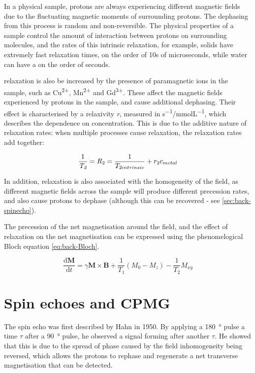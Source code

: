 In a physical sample, protons are always experiencing different magnetic fields due to the fluctuating magnetic moments of surrounding protons.
The dephasing from this process is random and non-reversible.
The physical properties of a sample control the amount of interaction between protons on surrounding molecules, and the rates of this intrinsic \Ttwo relaxation, for example, solids have extremely fast \Ttwo relaxation times, on the order of 10s of microseconds, while water can have a \Ttwo on the order of seconds.

\Ttwo relaxation is also be increased by the presence of paramagnetic ions in the sample, such as Cu\textsuperscript{2+}, Mn\textsuperscript{2+} and Gd\textsuperscript{3+}.
These affect the magnetic fields experienced by protons in the sample, and cause additional dephasing.
Their effect is characterised by a relaxivity \textit{r}, measured in \si{s^{-1}/mmolL^{-1}}, which describes the dependence on concentration.
This is due to the additive nature of relaxation rates: when multiple processes cause relaxation, the relaxation rates add together:

\begin{displaymath}
\frac{1}{\textit{T\textsubscript{2}}} = R_2 = \frac{1}{T_{2 intrinsic}} + r_{2} c_{metal}
\end{displaymath}

In addition, \Ttwo relaxation is also associated with the homogeneity of the \Bzero field, as different magnetic fields across the sample will produce different precession rates, and also cause protons to dephase (although this can be recovered - see \autoref{sec:back-spinecho}).

The precession of the net magnetisation around the \Bzero field, and the effect of relaxation on the net magnetisation can be expressed using the phenomelogical Bloch equation \autoref{eq:back-Bloch}.

\begin{equation}
\frac{\mathrm{d}\mathbf{M}}{\mathrm{d}t} = \gamma \mathbf{M} \times \mathbf{B} + \frac{1}{T_1} (M_0 - M_z) - \frac{1}{T_2} M_{xy}
\label{eq:back-Bloch}
\end{equation}

\section{Spin echoes and CPMG}
\label{sec:back-spinecho}
The spin echo was first described by Hahn in 1950\cite{HahnSpinEchoes1950}.
By applying a \SI{180}{\degree} pulse a time $\tau$ after a \SI{90}{\degree} pulse, he observed a signal forming after another $\tau$.
He showed that this is due to the spread of phase caused by the \Bzero field inhomogeneity being reversed, which allows the protons to rephase and regenerate a net transverse magnetisation that can be detected.

